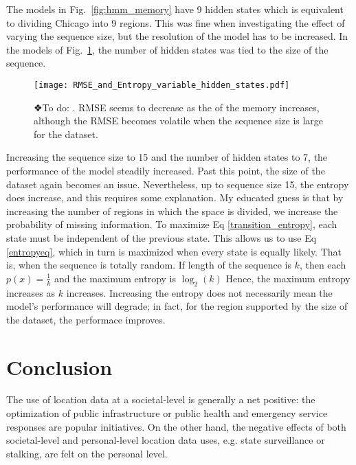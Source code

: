 \documentclass[11pt]{amsart}
\begin{document}
The models in Fig.~\ref{fig:hmm_memory} have 9 hidden states which is equivalent to dividing Chicago into 9 regions.
This was fine when investigating the effect of varying the sequence size, but the resolution of the model has to be increased.
In the models of Fig.~\ref{fig:hmm_hidstate}, the number of hidden states was tied to the size of the sequence.

\begin{figure}[h!]
    \centering
    \texttt{[image: RMSE\_and\_Entropy\_variable\_hidden\_states.pdf]} %
    \caption{❖To do: .
    RMSE seems to decrease as the of the memory increases, although the RMSE becomes volatile when the sequence size is large for the dataset.}
    \label{fig:hmm_hidstate}
\end{figure}
Increasing the sequence size to 15 and the number of hidden states to 7, the performance of the model steadily increased.
Past this point, the size of the dataset again becomes an issue.
Nevertheless, up to sequence size 15, the entropy does increase, and this requires some explanation.
My educated guess is that by increasing the number of regions in which the space is divided, we increase the probability of missing information.
To maximize Eq \ref{transition_entropy}, each state must be independent of the previous state.
This allows us to use Eq \ref{entropyeq}, which in turn is maximized when every state is equally likely.
That is, when the sequence is totally random.
If length of the sequence is $k$, then each $p( x ) = \frac 1 k$ and the maximum entropy is $\log_2( k )$
Hence, the maximum entropy increases as $k$ increases.
Increasing the entropy does not necessarily mean the model's performance will degrade; in fact, for the region supported by the size of the dataset, the performace improves.
\section{Conclusion}

The use of location data at a societal-level is generally a net positive: the optimization of public infrastructure or public health and emergency service responses are popular initiatives.
On the other hand, the negative effects of both societal-level and personal-level location data uses, e.g. state surveillance or stalking, are felt on the personal level.
\end{document}
